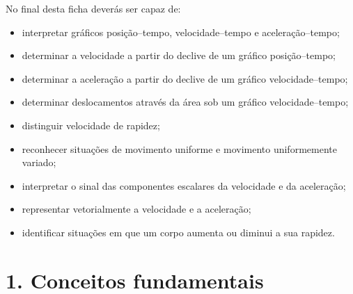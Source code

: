 \documentclass[11pt,a4paper]{article}
\begin{document}
	\begin{objetivos}
		
		No final desta ficha deverás ser capaz de:
		
		\begin{itemize}
			
			\item interpretar gráficos posição--tempo, velocidade--tempo e
			aceleração--tempo;
			
			\item determinar a velocidade a partir do declive de um gráfico
			posição--tempo;
			
			\item determinar a aceleração a partir do declive de um gráfico
			velocidade--tempo;
			
			\item determinar deslocamentos através da área sob um gráfico
			velocidade--tempo;
			
			\item distinguir velocidade de rapidez;
			
			\item reconhecer situações de movimento uniforme e movimento uniformemente
			variado;
			
			\item interpretar o sinal das componentes escalares da velocidade e da
			aceleração;
			
			\item representar vetorialmente a velocidade e a aceleração;
			
			\item identificar situações em que um corpo aumenta ou diminui a sua
			rapidez.
			
		\end{itemize}
		
	\end{objetivos}
	
	\section*{1. Conceitos fundamentais}
	
\end{document}
